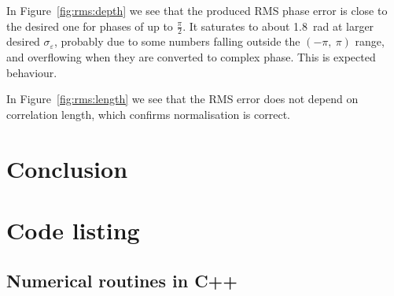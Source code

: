 \documentclass[11pt]{article}
\newcommand{\eps}{\varepsilon}
\begin{document}
In Figure~\ref{fig:rms:depth} we see that the produced RMS phase error is close to the desired one for phases of up to $\frac{\pi}{2}$. It saturates to about \SI{1.8}{\radian} at larger desired $\sigma_\eps$, probably due to some numbers falling outside the $(-\pi,\ \pi)$ range, and overflowing when they are converted to complex phase. This is expected behaviour.

In Figure~\ref{fig:rms:length} we see that the RMS error does not depend on correlation length, which confirms normalisation is correct.

\section{Conclusion}\label{sec:conclusion}

\printbibliography{}
\pagebreak

\appendix
\section{Code listing}
\subsection{Numerical routines in C++}





\end{document}
